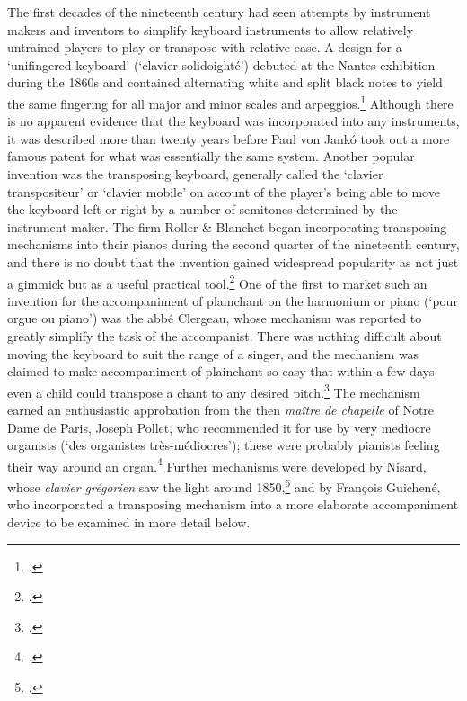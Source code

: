 The first decades of the nineteenth century had seen attempts by instrument makers and inventors to simplify keyboard instruments to allow relatively untrained players to play or transpose with relative ease.
A design for a `unifingered keyboard' (`clavier solidoighté') debuted at the Nantes exhibition during the 1860s and contained alternating white and split black notes to yield the same fingering for all major and minor scales and arpeggios.\footcite[4, 10]{DelcampMethodeelementairerelative1861}
Although there is no apparent evidence that the keyboard was incorporated into any instruments, it was described more than twenty years before Paul von Jankó took out a more famous patent for what was essentially the same system.
Another popular invention was the transposing keyboard, generally called the `clavier transpositeur' or `clavier mobile' on account of the player's being able to move the keyboard left or right by a number of semitones determined by the instrument maker.
The firm Roller \& Blanchet began incorporating transposing mechanisms into their pianos during the second quarter of the nineteenth century, and there is no doubt that the invention gained widespread popularity as not just a gimmick but as a useful practical tool.\footcite[177]{DanjouMecanismemusicaltranspositeur1845}
%
One of the first to market such an invention for the accompaniment of plainchant on the harmonium or piano (`pour orgue ou piano') was the abbé Clergeau, whose mechanism was reported to greatly simplify the task of the accompanist.
There was nothing difficult about moving the keyboard to suit the range of a singer, and the mechanism was claimed to make accompaniment of plainchant so easy that within a few days even a child could transpose a chant to any desired pitch.\footcite[3--5]{ClergeauMecanismemusicaltranspositeur1845}
The mechanism earned an enthusiastic approbation from the then \textit{maître de chapelle} of Notre Dame de Paris, Joseph Pollet, who recommended it for use by very mediocre organists (`des organistes très-médiocres'); these were probably pianists feeling their way around an organ.\footcite[15--16]{PolletRapportadresseau1845}
Further mechanisms were developed by Nisard, whose \textit{clavier grégorien} saw the light around 1850,\footcite[357]{FetisCorrespondance2006} and by François Guichené, who incorporated a transposing mechanism into a more elaborate accompaniment device to be examined in more detail below.

